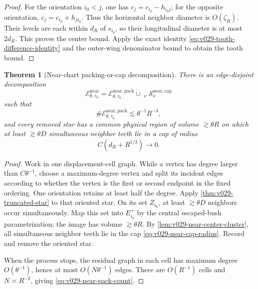 \documentclass[10pt]{article}
\newtheorem{theorem}{Theorem}[section]
\begin{document}
\begin{proof}
For the orientation \(i_0<j\), one has
\(c_j=c_{i_0}-h_{i_0j}\); for the opposite orientation,
\(c_j=c_{i_0}+h_{ji_0}\).  Thus the horizontal neighbor diameter is \(O(\zeta_R)\).  Their levels
are each within \(d_R\) of \(s_{i_0}\), so their longitudinal diameter is at most \(2d_R\).  This
proves the center bound.  Apply the exact identity
\eqref{eq:v029-tooth-difference-identity} and the outer-wing denominator bound to obtain the tooth
bound.
\end{proof}

\begin{theorem}[Near-chart packing-or-cap decomposition]
\label{thm:v029-near-decomposition}
There is an edge-disjoint decomposition
\begin{equation}
\label{eq:v029-near-edge-decomposition}
\boxed{
\mathcal E_{\theta,\tau_0}^{\mathrm{near}}
=
\mathcal E_{\theta,\tau_0}^{\mathrm{near,pack}}
\mathbin{\dot\cup}
\mathop{\dot\bigcup}_{\nu}
\mathcal S_{\nu}^{\mathrm{near,cap}}
}
\end{equation}
such that
\begin{equation}
\label{eq:v029-near-pack-count}
\boxed{
\#\mathcal E_{\theta,\tau_0}^{\mathrm{near,pack}}
\lesssim
\theta^{-1}R^{-3},
}
\end{equation}
and every removed star has a common physical region of volume \(\gtrsim\theta R\) on which at least
\(\gtrsim\theta D\) simultaneous neighbor teeth lie in a cap of radius
\begin{equation}
\label{eq:v029-near-cap-radius}
\boxed{
C(d_R+R^{1/3})
\longrightarrow
0.
}
\end{equation}
\end{theorem}

\begin{proof}
Work in one displacement-cell graph.  While a vertex has degree larger than
\(C\theta^{-1}\), choose a maximum-degree vertex and split its incident edges according to whether
the vertex is the first or second endpoint in the fixed ordering.  One orientation retains at least
half the degree.  Apply
\cref{thm:v029-truncated-star} to that oriented star.  On its set \(Z_{i_0}\), at least
\(\gtrsim\theta D\) neighbors occur simultaneously.  Map this set into \(E_{i_0}^+\) by the
central escaped-bush parametrization; the image has volume \(\gtrsim\theta R\).  By
\cref{lem:v029-near-center-cluster}, all simultaneous neighbor teeth lie in the cap
\eqref{eq:v029-near-cap-radius}.  Record and remove the oriented star.

When the process stops, the residual graph in each cell has maximum degree
\(O(\theta^{-1})\), hence at most \(O(N\theta^{-1})\) edges.  There are \(O(R^{-1})\) cells and
\(N\asymp R^{-2}\), giving
\eqref{eq:v029-near-pack-count}.
\end{proof}
\end{document}
